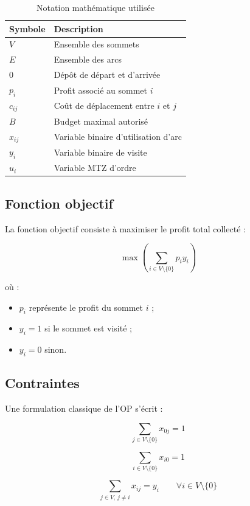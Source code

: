 \documentclass[11pt,a4paper]{article}
\begin{document}
\begin{table}[H]
\centering
\caption{Notation mathématique utilisée}
\begin{tabular}{ll}
\toprule
\textbf{Symbole} & \textbf{Description} \\
\midrule
$V$ & Ensemble des sommets \\
$E$ & Ensemble des arcs \\
$0$ & Dépôt de départ et d'arrivée \\
$p_i$ & Profit associé au sommet $i$ \\
$c_{ij}$ & Coût de déplacement entre $i$ et $j$ \\
$B$ & Budget maximal autorisé \\
$x_{ij}$ & Variable binaire d'utilisation d'arc \\
$y_i$ & Variable binaire de visite \\
$u_i$ & Variable MTZ d'ordre \\
\bottomrule
\end{tabular}
\end{table}

\subsection{Fonction objectif}

La fonction objectif consiste à maximiser le profit total collecté :

\[
\boxed{
\max \left(
\sum_{i\in V\setminus\{0\}} p_i y_i
\right)
}
\]

où :

\begin{itemize}
    \item $p_i$ représente le profit du sommet $i$ ;
    \item $y_i=1$ si le sommet est visité ;
    \item $y_i=0$ sinon.
\end{itemize}

\subsection{Contraintes}

Une formulation classique de l'OP s'écrit :

\[
\sum_{j\in V\setminus\{0\}} x_{0j}=1
\]

\[
\sum_{i\in V\setminus\{0\}} x_{i0}=1
\]

\[
\sum_{j\in V,\, j\neq i}x_{ij}=y_i
\qquad
\forall i\in V\setminus\{0\}
\]
\end{document}

